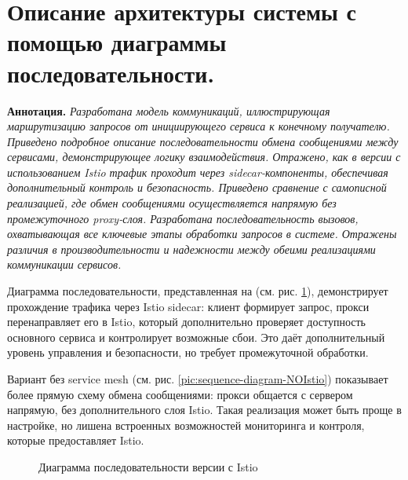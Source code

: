 \section{Описание архитектуры системы с помощью диаграммы последовательности.}

\textbf{Аннотация.} \textit{Разработана модель коммуникаций, иллюстрирующая маршрутизацию запросов от инициирующего сервиса к конечному получателю. Приведено подробное описание последовательности обмена сообщениями между сервисами, демонстрирующее логику взаимодействия. Отражено, как в версии с использованием Istio трафик проходит через sidecar-компоненты, обеспечивая дополнительный контроль и безопасность. Приведено сравнение с самописной реализацией, где обмен сообщениями осуществляется напрямую без промежуточного proxy-слоя. Разработана последовательность вызовов, охватывающая все ключевые этапы обработки запросов в системе. Отражены различия в производительности и надежности между обеими реализациями коммуникации сервисов.}

Диаграмма последовательности, представленная на (см. рис. \ref{pic:sequence-diagram-Istio}), демонстрирует прохождение трафика через Istio sidecar: клиент формирует запрос, прокси перенаправляет его в Istio, который дополнительно проверяет доступность основного сервиса и контролирует возможные сбои. Это даёт дополнительный уровень управления и безопасности, но требует промежуточной обработки.

Вариант без service mesh (см. рис. \ref{pic:sequence-diagram-NOIstio}) показывает более прямую схему обмена сообщениями: прокси общается с сервером напрямую, без дополнительного слоя Istio. Такая реализация может быть проще в настройке, но лишена встроенных возможностей мониторинга и контроля, которые предоставляет Istio.
 


\begin{figure}[t]
    \centering
    \caption{Диаграмма последовательности версии с Istio}
    \label{pic:sequence-diagram-Istio}
  \end{figure}


